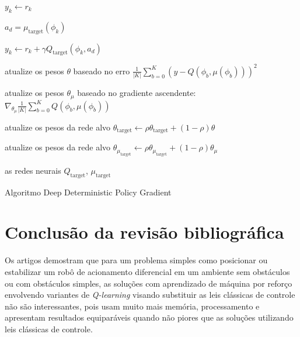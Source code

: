 \begin{algorithm}[H]
{{{{{                        $y_k \leftarrow r_k$
                      }
                      {
                        $a_d = \mu_{\text{target}}(\phi_k)$
    
                        $y_k \leftarrow r_k + \gamma Q_{\text{target}}(\phi_k,a_d)$
                      }
                    
                }

                atualize os pesos $\theta$ baseado no erro  $\frac{1}{|K|} \sum_{b =0}^{K} (y -Q(\phi_b,\mu(\phi_b)))^2$
                
                atualize os pesos $\theta_\mu$ baseado no gradiente ascendente:
                $\nabla_{\theta_\mu} \frac{1}{|K|} \sum_{b =0}^{K} Q(\phi_b,\mu(\phi_b))$
            
            }

           
        }

        atualize os pesos da rede alvo $\theta_{\text{target}}  \leftarrow \rho \theta_{\text{target}}  + (1-\rho) \theta$

        atualize os pesos da rede alvo $\theta_{\mu_{\text{target}}}  \leftarrow \rho \theta_{\mu_{\text{target}}}  + (1-\rho)\theta_\mu$

        
    }
    \Retorna as redes neurais $Q_{\text{target}}$, $\mu_{\text{target}}$
    \caption{Algoritmo Deep Deterministic Policy Gradient}
    \label{Deep Deterministic Policy Gradient:}
\end{algorithm}


\section{Conclusão da revisão bibliográfica}
\label{sec:conclusao:revisao:bibliografica}
Os artigos demostram que para um problema simples como posicionar ou estabilizar
um robô de acionamento diferencial em um ambiente sem obstáculos ou com
obstáculos simples, as soluções com aprendizado de máquina por reforço
envolvendo variantes de \textit{Q-learning} visando substituir as
leis clássicas de controle não são interessantes, pois usam muito mais
memória, processamento e apresentam resultados equiparáveis quando não
piores que as soluções utilizando leis clássicas de controle. 